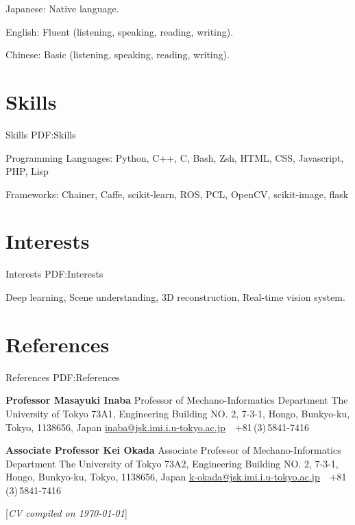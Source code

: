 \documentclass[letterpaper,MMMyyyy,nonstop]{simpleresumecv}
\newcommand{\CVNote}{CV compiled on {\today}}
\begin{document}
\begin{body}
\BulletItem
Japanese: Native language.

\GapNoBreak
\BulletItem
English: Fluent (listening, speaking, reading, writing).

\GapNoBreak
\BulletItem
Chinese: Basic (listening, speaking, reading, writing).


\section
{Skills}
{Skills}
{PDF:Skills}

\BulletItem
Programming Languages: Python, C++, C, Bash, Zsh, HTML, CSS, Javascript, PHP, Lisp

\GapNoBreak
\BulletItem
Frameworks: Chainer, Caffe, scikit-learn, ROS, PCL, OpenCV, scikit-image, flask


\section
{Interests}
{Interests}
{PDF:Interests}

Deep learning,
Scene understanding,
3D reconstruction,
Real-time vision system.


\section
{References}
{References}
{PDF:References}

\BulletItem
\textbf{Professor Masayuki Inaba}
\newline
Professor of Mechano-Informatics Department
\newline
The University of Tokyo
\newline
73A1, Engineering Building NO. 2, 7-3-1, Hongo, Bunkyo-ku, Tokyo, 1138656, Japan
\newline
\href{mailto:inaba@jsk.imi.i.u-tokyo.ac.jp}
{inaba@jsk.imi.i.u-tokyo.ac.jp}
\,\SubBulletSymbol\,
+81\,(3)\,5841-7416

\BigGap
\BulletItem
\textbf{Associate Professor Kei Okada}
\newline
Associate Professor of Mechano-Informatics Department
\newline
The University of Tokyo
\newline
73A2, Engineering Building NO. 2, 7-3-1, Hongo, Bunkyo-ku, Tokyo, 1138656, Japan
\newline
\href{mailto:k-okada@jsk.imi.i.u-tokyo.ac.jp}
{k-okada@jsk.imi.i.u-tokyo.ac.jp}
\,\SubBulletSymbol\,
+81\,(3)\,5841-7416

\end{body}


\UseNoteFont%
\null\hfill%
[\textit{\CVNote}]%
\hspace{2.0mm}\null
\end{document}
